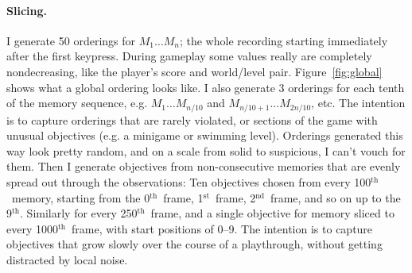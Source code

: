 \documentclass[twocolumn]{article}
\newcommand\st{$^{\mathrm{st}}$}
\newcommand\nd{$^{\mathrm{nd}}$}
\renewcommand\th{$^{\mathrm{th}}$}
\begin{document}
\paragraph{Slicing.} I generate 50 orderings for $M_1 \ldots M_n$; the
whole recording starting immediately after the first keypress. During
gameplay some values really are completely nondecreasing, like the
player's score and world/level pair. Figure~\ref{fig:global} shows
what a global ordering looks like. I also generate 3 orderings for
each tenth of the memory sequence, e.g. $M_1 \ldots M_{n/10}$ and
$M_{n/10+1} \ldots M_{2n/10}$, etc. The intention is to capture
orderings that are rarely violated, or sections of the game with
unusual objectives (e.g. a minigame or swimming level). Orderings
generated this way look pretty random, and on a scale from solid to
suspicious, I can't vouch for them. Then I generate objectives from
non-consecutive memories that are evenly spread out through the
observations: Ten objectives chosen from every 100\th\ memory,
starting from the 0\th\ frame, 1\st\ frame, 2\nd\ frame, and so on up
to the 9\th{}. Similarly for every 250\th\ frame, and a single
objective for memory sliced to every 1000\th\ frame, with start
positions of 0--9. The intention is to capture objectives that grow
slowly over the course of a playthrough, without getting distracted by
local noise.
\end{document}
